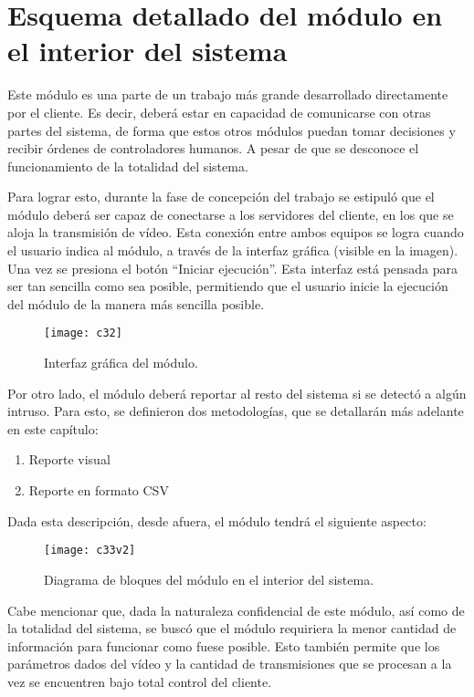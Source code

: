 \section{Esquema detallado del módulo en el interior del sistema}

Este módulo es una parte de un trabajo más grande desarrollado directamente por el cliente. Es decir, deberá estar en capacidad de comunicarse con otras partes del sistema, de forma que estos otros módulos puedan tomar decisiones y recibir órdenes de controladores humanos. A pesar de que se desconoce el funcionamiento de la totalidad del sistema.  

Para lograr esto, durante la fase de concepción del trabajo se estipuló que el módulo deberá ser capaz de conectarse a los servidores del cliente, en los que se aloja la transmisión de vídeo. Esta conexión entre ambos equipos se logra cuando el usuario indica al módulo, a través de la interfaz gráfica (visible en la imagen). Una vez se presiona el botón “Iniciar ejecución”. Esta interfaz está pensada para ser tan sencilla como sea posible, permitiendo que el usuario inicie la ejecución del módulo de la manera más sencilla posible.

\begin{figure}[!ht]
    \centering
    \texttt{[image: c32]}
    \caption{Interfaz gráfica del módulo.}
    \label{fig:gui}
\end{figure} 

Por otro lado, el módulo deberá reportar al resto del sistema si se detectó a algún intruso. Para esto, se definieron dos metodologías, que se detallarán más adelante en este capítulo:

\begin{enumerate}

	\item Reporte visual
	\item Reporte en formato CSV

\end{enumerate}

Dada esta descripción, desde afuera, el módulo tendrá el siguiente aspecto:

\begin{figure}[!ht]
    \centering
    \texttt{[image: c33v2]}
    \caption{Diagrama de bloques del módulo en el interior del sistema.}
    \label{fig:mesh1}
\end{figure} 

Cabe mencionar que, dada la naturaleza confidencial de este módulo, así como de la totalidad del sistema, se buscó que el módulo requiriera la menor cantidad de información para funcionar como fuese posible. Esto también permite que los parámetros dados del vídeo y la cantidad de transmisiones que se procesan a la vez se encuentren bajo total control del cliente. 

